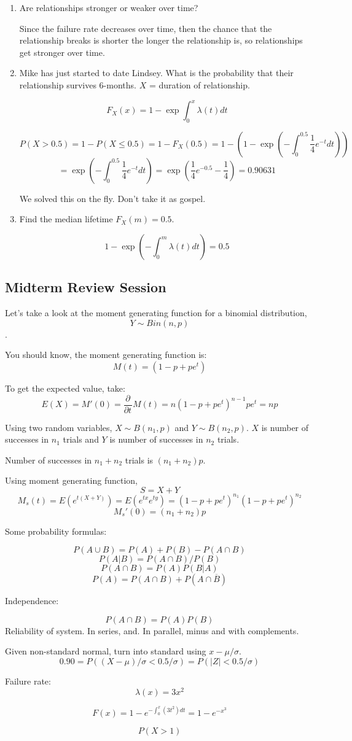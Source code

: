 \documentclass{report}
\newcommand{\deriv}[3][]{
  \ensuremath{\frac{\partial^{#1} {#2}}{\partial {#3}^{#1}}}}
\begin{document}
\begin{enumerate}
\item Are relationships stronger or weaker over time?

Since the failure rate decreases over time, then the chance that the relationship breaks is shorter the longer the relationship is, so relationships get stronger over time.

\item Mike has just started to date Lindsey. What is the probability that their relationship survives 6-months. $X$ = duration of relationship.

$$F_X(x) = 1 - \exp{\int_0^x \lambda(t) dt}$$

$$ P(X > 0.5) = 1- P(X \leq 0.5) = 1 - F_X(0.5) = 1-(1-\exp(- \int_{0}^{0.5} \frac{1}{4} e^{-t} dt))$$ $$ = \exp(- \int_{0}^{0.5} \frac{1}{4} e^{-t} dt) = \exp(\frac{1}{4} e^{-0.5} - \frac{1}{4}) = 0.90631 $$ 

We solved this on the fly. Don't take it as gospel.

\item Find the median lifetime $F_X(m) = 0.5$.

$$1-\exp(- \int_{0}^{m} \lambda(t) dt) = 0.5$$
\end{enumerate}

\subsection{Midterm Review Session}

Let's take a look at the moment generating function for a binomial distribution, $$Y \sim Bin(n,p)$$.

You should know, the moment generating function is: $$M(t) = (1-p+pe^t)$$ 

To get the expected value, take: $$E(X) = M'(0) = \deriv{}{t}{} M(t) = n(1-p+pe^t)^{n-1}pe^t = np$$

Using two random variables, $X \sim B(n_1,p)$ and $Y \sim B(n_2,p)$. $X$ is number of successes in $n_1$ trials and $Y$ is number of successes in $n_2$ trials.

Number of successes in $n_1+n_2$ trials is $(n_1 +n_2)p$.

Using moment generating function,  $$S = X +Y$$ $$M_s(t) = E(e^{t(X+Y)}) = E(e^{tx}e^{ty}) = (1-p+pe^t)^{n_1}(1-p+pe^t)^{n_2}$$ $$M_s'(0) = (n_1+n_2)p$$

Some probability formulas:

$$P(A \cup B) = P(A) + P(B) - P(A \cap B)$$
$$P(A|B) = P(A \cap B)/P(B) $$
$$P(A \cap B) = P(A)P(B|A)$$
$$P(A) = P(A \cap B) + P(A \cap \overline{B})$$

Independence:

$$P(A \cap B) = P(A)P(B)$$
Reliability of system. In series, and. In parallel, minus and with complements.


Given non-standard normal, turn into standard using $x-\mu/\sigma$.
$$0.90 = P((X - \mu)/\sigma < 0.5/\sigma ) = P(|Z| < 0.5/\sigma) $$

Failure rate: $$\lambda(x) = 3x^2$$

$$F(x) = 1-e^{-\int_0^x( 3t^2 )dt} = 1-e^{-x^3} $$

$$P(X > 1)$$
\end{document}
